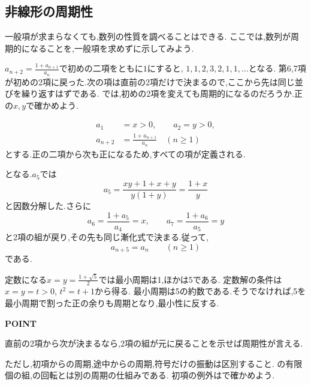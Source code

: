 \subsection{非線形の周期性}\label{節：非線形の周期性}
一般項が求まらなくても,数列の性質を調べることはできる.
ここでは,数列が周期的になることを,一般項を求めずに示してみよう.

$a_{n+2}=\frac{1+a_{n+1}}{a_n}$で初めの二項をともに$1$にすると,
$1,1,2,3,2,1,1,\ldots$となる.
第6,7項が初めの2項に戻った.次の項は直前の2項だけで決まるので,ここから先は同じ並びを繰り返すはずである.
では,初めの2項を変えても周期的になるのだろうか.正の$x,y$で確かめよう.

\[
  \begin{aligned}
    a_1&=x>0,\qquad a_2=y>0,\\
    a_{n+2}&=\frac{1+a_{n+1}}{a_n}\quad(n\ge1)
  \end{aligned}
\]
とする.正の二項から次も正になるため,すべての項が定義される.

\BookMathLayout{\[
    a_3=\frac{1+y}{x},\qquad
    a_4=\frac{1+x+y}{xy},\qquad
    a_5=\frac{1+x}{y}
  \]}{\[
    \begin{aligned}
      a_3&=\frac{1+y}{x},\\
      a_4&=\frac{1+x+y}{xy},\\
      a_5&=\frac{1+x}{y}
    \end{aligned}
  \]}
となる.$a_5$では
\[
  a_5=\frac{xy+1+x+y}{y(1+y)}=\frac{1+x}{y}
\]
と因数分解した.さらに
\[
  a_6=\frac{1+a_5}{a_4}=x,\qquad
  a_7=\frac{1+a_6}{a_5}=y
\]
と2項の組が戻り,その先も同じ漸化式で決まる.従って,
\[
  a_{n+5}=a_n\qquad(n\ge1)
\]
である.

定数になる$x=y=\frac{1+\sqrt5}{2}$では最小周期は1,ほかは5である.
定数解の条件は$x=y=t>0$, $t^2=t+1$から得る.
最小周期は5の約数である.そうでなければ,5を最小周期で割った正の余りも周期となり,最小性に反する.

\begin{bookpoint}
  \textbf{POINT}\par
  直前の2項から次が決まるなら,2項の組が元に戻ることを示せば周期性が言える.
\end{bookpoint}
ただし,初項からの周期,途中からの周期,符号だけの振動は区別すること.
の有限個の組,の回転とは別の周期の仕組みである.
初項の例外はで確かめよう.

